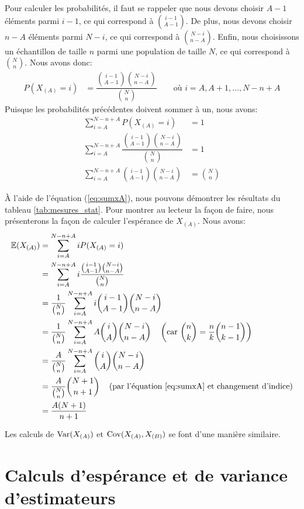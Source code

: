 \documentclass[10pt]{article}
\begin{document}
Pour calculer les probabilités, il faut se rappeler que nous devons
choisir \(A-1\) éléments parmi \(i-1\), ce qui correspond à
\(\binom{i-1}{A-1}\). De plus, nous devons choisir \(n-A\) éléments
parmi \(N-i\), ce qui correspond à \(\binom{N-i}{n-A}\). Enfin, nous
choisissons un échantillon de taille \(n\) parmi une population de
taille \(N\), ce qui correspond à \(\binom{N}{n}\). Nous avons donc:
\begin{align*}
P(X_{(A)}=i) &= \dfrac{\binom{i-1}{A-1}\binom{N-i}{n-A}}{\binom{N}{n}} \qquad \text{où } i=A,A+1,\ldots,N-n+A
\end{align*} Puisque les probabilités précédentes doivent sommer à un,
nous avons: \begin{align}
\sum_{i=A}^{N-n+A} P(X_{(A)}=i) &= 1 \nonumber\\
\sum_{i=A}^{N-n+A} \dfrac{\binom{i-1}{A-1}\binom{N-i}{n-A}}{\binom{N}{n}} &= 1 \nonumber\\
\sum_{i=A}^{N-n+A} \binom{i-1}{A-1}\binom{N-i}{n-A} &= \binom{N}{n} \label{eq:sumxA}
\end{align}

À l'aide de l'équation (\ref{eq:sumxA}), nous pouvons démontrer les
résultats du tableau \ref{tab:mesures_stat}. Pour montrer au lecteur la
façon de faire, nous présenterons la façon de calculer l'espérance de
\(X_{(A)}\). Nous avons: \begin{align}
\operatorname{\mathbb{E}}(X_{(A)}) &= \sum_{i=A}^{N-n+A} iP(X_{(A)}=i) \nonumber\\
&= \sum_{i=A}^{N-n+A} i\dfrac{\binom{i-1}{A-1}\binom{N-i}{n-A}}{\binom{N}{n}} \nonumber\\
&= \dfrac{1}{\binom{N}{n}}\sum_{i=A}^{N-n+A} i\binom{i-1}{A-1}\binom{N-i}{n-A} \nonumber\\
&= \dfrac{1}{\binom{N}{n}}\sum_{i=A}^{N-n+A} A\binom{i}{A}\binom{N-i}{n-A} 
\quad\left(\text{car $\binom{n}{k}=\dfrac{n}{k}\binom{n-1}{k-1}$}\right) \nonumber\\
&= \dfrac{A}{\binom{N}{n}}\sum_{i=A}^{N-n+A} \binom{i}{A}\binom{N-i}{n-A} \nonumber\\
&= \dfrac{A}{\binom{N}{n}}\binom{N+1}{n+1} \quad\left(\text{par l'équation \ref{eq:sumxA} et changement d'indice}\right) \nonumber\\
&= \dfrac{A(N+1)}{n+1} \label{eq:esperancexA}
\end{align}

Les calculs de \(\operatorname{Var}(X_{(A)})\) et \(\operatorname{Cov}(X_{(A)},X_{(B)})\) se font
d'une manière similaire.

\hypertarget{calculs-desperance-et-de-variance-destimateurs}{%
\section{\texorpdfstring{Calculs d'espérance et de variance
d'estimateurs
\label{calculs_estimateurs}}{Calculs d'espérance et de variance d'estimateurs }}\label{calculs-desperance-et-de-variance-destimateurs}}
\end{document}
